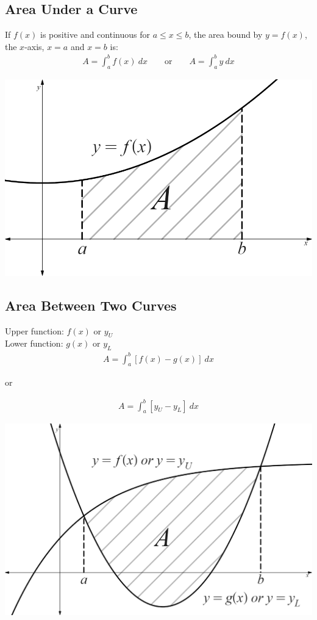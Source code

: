 \documentclass[10pt, a4paper, titlepage]{article}
\begin{document}
\begin{multicols*}{3}
\dotfill
\subsection{Area Under a Curve}
If $f(x)$ is positive and continuous for $a\leq x\leq b$, the area bound by $y=f(x)$, the $x$-axis, $x=a$ and $x=b$ is:
\begin{align}
	A=\int_{a}^{b}f(x)\ dx\qquad \text{or}\qquad A=\int_{a}^{b}y\ dx
\end{align}
\begin{center}
	\includegraphics[width=0.9\linewidth]{area_under_a_curve.png}\\
\end{center}

\dotfill
\subsection{Area Between Two Curves}
Upper function: $f(x)$ or $y_U$\\
Lower function: $g(x)$ or $y_L$
\begin{align}
	A=\int_{a}^{b}\left[f(x)-g(x)\right]\ dx
\end{align}
\begin{center}
	or
\end{center}
\begin{align}
	A=\int_{a}^{b}\left[y_U-y_L\right]\ dx
\end{align}
\begin{center}
	\includegraphics[width=0.9\linewidth]{area_between_two_curves.png}\\
\end{center}


\end{multicols*}
\end{document}
